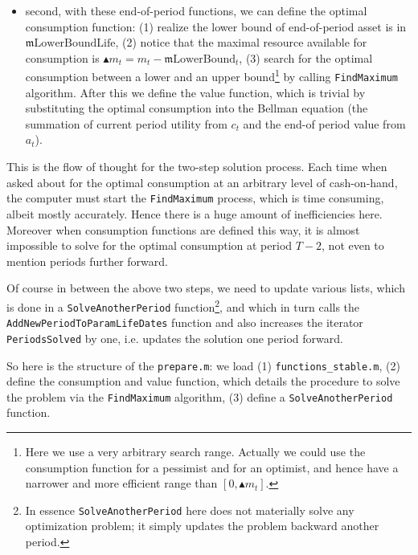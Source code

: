 \documentclass[titlepage,abstract]{\econtex}
\providecommand{\mEndLowerBoundLife}{\ensuremath{\mathfrak{m}}\text{LowerBoundLife}}
\providecommand{\mEndLowerBound}{\ensuremath{\mathfrak{m}}\text{LowerBound}}
\begin{document}
\begin{itemize}
\begin{equation}
\begin{gathered}
\begin{aligned}
                   &=& =  =  =  =  =  \frac{\ensuremath{\mathfrak{v}}_{t}''(a_{t})}{u\text{PP}\Big(\big(\ensuremath{\mathfrak{v}}_{t}'(a_{t})\big)^{-1/\rho}\Big)}
            \end{aligned}\end{gathered}\end{equation}
      \item second, with these end-of-period functions, we can define the optimal consumption function: (1) realize the lower bound of end-of-period asset is in $\mEndLowerBoundLife$, (2) notice that the maximal resource available for consumption is $\blacktriangle m_{t}=m_{t}- \mEndLowerBound_{t}$, (3) search for the optimal consumption between a lower and an upper bound\footnote{Here we use a very arbitrary search range. Actually we could use the consumption function for a pessimist and for an optimist, and hence have a narrower and more efficient range than $[0, \blacktriangle m_{t}]$.} by calling \texttt{FindMaximum} algorithm. After this we define the value function, which is trivial by substituting the optimal consumption into the Bellman equation (the summation of current period utility from $c_{t}$ and the end-of period value from $a_{t}$).
\end{itemize}

This is the flow of thought for the two-step solution process. Each time when asked about for the optimal consumption at an arbitrary level of cash-on-hand, the computer must start the \texttt{FindMaximum} process, which is time consuming, albeit mostly accurately. Hence there is a huge amount of inefficiencies here. Moreover when consumption functions are defined this way, it is almost impossible to solve for the optimal consumption at period $T-2$, not even to mention periods further forward.

Of course in between the above two steps, we need to update various lists, which is done in a \texttt{SolveAnotherPeriod} function\footnote{In essence \texttt{SolveAnotherPeriod} here does not materially solve any optimization problem; it simply updates the problem backward another period.}, and which in turn calls the \texttt{AddNewPeriodToParamLifeDates} function and also increases the iterator \texttt{PeriodsSolved} by one, i.e. updates the solution one period forward.

So here is the structure of the \texttt{prepare.m}: we load (1) \texttt{functions\_stable.m}, (2) define the consumption and value function, which details the procedure to solve the problem via the \texttt{FindMaximum} algorithm, (3) define a \texttt{SolveAnotherPeriod} function.
\end{document}
